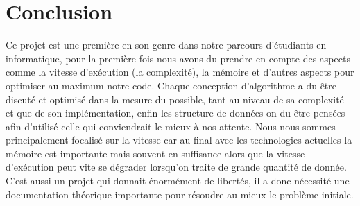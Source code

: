 \documentclass[12pt, oneside]{article}
\begin{document}
\section{Conclusion}
Ce projet est une première en son genre dans notre parcours d'étudiants en informatique, pour la première fois nous avons du prendre en compte des aspects comme la vitesse d'exécution (la complexité), la mémoire et d'autres aspects pour optimiser au maximum notre code. Chaque conception d'algorithme a du être discuté et optimisé dans la mesure du possible, tant au niveau de sa complexité et que de son implémentation, enfin les structure de données on du être pensées afin d'utilisé celle qui conviendrait le mieux à nos attente. Nous nous sommes principalement focalisé sur la vitesse car au final avec les technologies actuelles la mémoire est importante mais souvent en suffisance alors que la vitesse d'exécution peut vite se dégrader lorsqu'on traite de grande quantité de donnée.
C'est aussi un projet qui donnait énormément de libertés, il a donc nécessité une documentation théorique importante pour résoudre au mieux le problème initiale.
\end{document}
